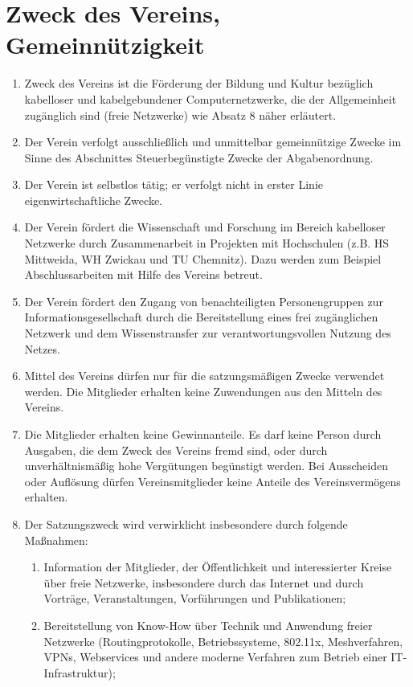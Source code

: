 \documentclass[a4paper,DIV10,12pt,headsepline]{scrartcl}
\begin{document}
\section{Zweck des Vereins, Gemeinnützigkeit}
\begin{enumerate}
	\item Zweck des Vereins ist die Förderung der Bildung und Kultur bezüglich kabelloser und kabelgebundener Computernetzwerke, die der Allgemeinheit zugänglich sind (freie Netzwerke) wie Absatz 8 näher erläutert.
	\item Der Verein verfolgt ausschließlich und unmittelbar gemeinnützige Zwecke im Sinne des Abschnittes {\glqq}Steuerbegünstigte Zwecke{\grqq} der Abgabenordnung. 
	\item Der Verein ist selbstlos tätig; er verfolgt nicht in erster Linie eigenwirtschaftliche Zwecke.
	\item Der Verein fördert die Wissenschaft und Forschung im Bereich kabelloser Netzwerke durch Zusammenarbeit in Projekten mit Hochschulen (z.B. HS Mittweida, WH Zwickau und TU Chemnitz). Dazu werden zum Beispiel Abschlussarbeiten mit Hilfe des Vereins betreut.
	\item Der Verein fördert den Zugang von benachteiligten Personengruppen zur Informationsgesellschaft durch die Bereitstellung eines frei zugänglichen Netzwerk und dem Wissenstransfer zur verantwortungsvollen Nutzung des Netzes.
	\item Mittel des Vereins dürfen nur für die satzungsmäßigen Zwecke verwendet werden. Die Mitglieder erhalten keine Zuwendungen aus den Mitteln des Vereins.
	\item Die Mitglieder erhalten keine Gewinnanteile. Es darf keine Person durch Ausgaben, die dem Zweck des Vereins fremd sind, oder durch unverhältnismäßig hohe Vergütungen begünstigt werden. Bei Ausscheiden oder Auflösung dürfen Vereinsmitglieder keine Anteile des Vereinsvermögens erhalten.
	\item Der Satzungszweck wird verwirklicht insbesondere durch folgende Maßnahmen:
	\begin{enumerate}
		\item Information der Mitglieder, der Öffentlichkeit und interessierter Kreise über freie Netzwerke, insbesondere durch das Internet und durch Vorträge, Veranstaltungen,
Vorführungen und Publikationen;
		\item Bereitstellung von Know-How über Technik und Anwendung freier Netzwerke (Routingprotokolle, Betriebssysteme, 802.11x, Meshverfahren, VPNs, Webservices und andere moderne Verfahren zum Betrieb einer IT-Infrastruktur);

\end{enumerate}
\end{enumerate}
\end{document}
